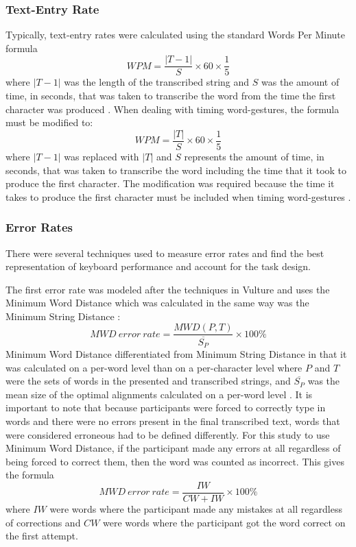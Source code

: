\subsubsection{Text-Entry Rate}
Typically, text-entry rates were calculated using the standard Words Per Minute formula
\begin{equation}
WPM = \frac{|T-1|}{S} \times 60 \times \frac{1}{5}
\end{equation}
where $|T-1|$ was the length of the transcribed string and $S$ was the amount of time, in seconds, that was taken to transcribe the word from the time the first character was produced \cite{ref_wpm_word_gesture_formula}. When dealing with timing word-gestures, the formula must be modified to:
\begin{equation} \label{WPM}
WPM = \frac{|T|}{S} \times 60 \times \frac{1}{5}
\end{equation}
where $|T-1|$ was replaced with $|T|$ and $S$ represents the amount of time, in seconds, that was taken to transcribe the word including the time that it took to produce the first character. The modification was required because the time it takes to produce the first character must be included when timing word-gestures \cite{ref_wpm_word_gesture_timing}.

\subsubsection{Error Rates}
There were several techniques used to measure error rates and find the best representation of keyboard performance and account for the task design.

The first error rate was modeled after the techniques in Vulture \cite{ref_vulture} and uses the Minimum Word Distance which was calculated in the same way was the Minimum String Distance \cite{ref_error_rates,ref_vulture_MSD_ref}:
\begin{equation} \label{MWD}
MWD\ error\ rate = \frac{MWD(P,T)}{\overline{S_P}} \times 100\%
\end{equation}
Minimum Word Distance differentiated from Minimum String Distance in that it was calculated on a per-word level than on a per-character level where $P$ and $T$ were the sets of words in the presented and transcribed strings, and $\overline{S_P}$ was the mean size of the optimal alignments calculated on a per-word level \cite{ref_vulture}. It is important to note that because participants were forced to correctly type in words and there were no errors present in the final transcribed text, words that were considered erroneous had to be defined differently. For this study to use Minimum Word Distance, if the participant made any errors at all regardless of being forced to correct them, then the word was counted as incorrect. This gives the formula
\begin{equation} \label{MWD_simple}
MWD\ error\ rate = \frac{IW}{CW + IW} \times 100\%
\end{equation}
where $IW$ were words where the participant made any mistakes at all regardless of corrections and $CW$ were words where the participant got the word correct on the first attempt.

